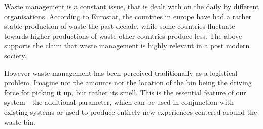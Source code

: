 Waste management is a constant issue, that is dealt with on the daily by different organisations.
According to Eurostat, the countries in europe have had a rather stable production of waste the past decade, while some countries fluctuate towards higher productions of waste other countries produce less.
The above supports the claim that waste management is highly relevant in a post modern society.

However waste management has been perceived traditionally as a logistical problem.
Imagine not the amounts nor the location of the bin being the driving force for picking it up, but rather its smell.
This is the essential feature of our system - the additional parameter, which can be used in conjunction with existing systems or used to produce entirely new experiences centered around the waste bin.
